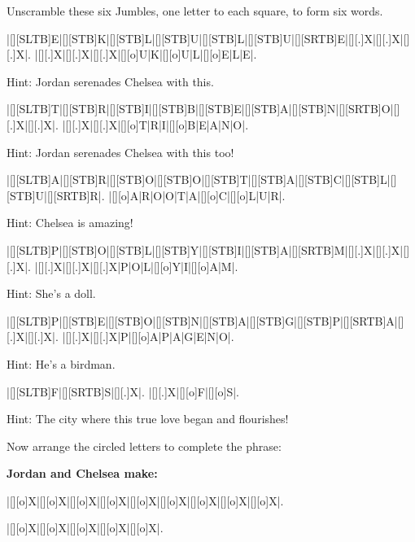 Unscramble these six Jumbles, one letter to each square, to form six words.\\

\begin{Puzzle}{10}{2}
|[][SLTB]E|[][STB]K|[][STB]L|[][STB]U|[][STB]L|[][STB]U|[][SRTB]E|[][.]X|[][.]X|[][.]X|.
|[][.]X|[][.]X|[][.]X|[][o]U|K|[][o]U|L|[][o]E|L|E|.
\end{Puzzle}
Hint: Jordan serenades Chelsea with this.\bigskip

\begin{Puzzle}{10}{2}
|[][SLTB]T|[][STB]R|[][STB]I|[][STB]B|[][STB]E|[][STB]A|[][STB]N|[][SRTB]O|[][.]X|[][.]X|.
|[][.]X|[][.]X|[][o]T|R|I|[][o]B|E|A|N|O|.
\end{Puzzle}
Hint: Jordan serenades Chelsea with this too!\bigskip

\begin{Puzzle}{10}{2}
|[][SLTB]A|[][STB]R|[][STB]O|[][STB]O|[][STB]T|[][STB]A|[][STB]C|[][STB]L|[][STB]U|[][SRTB]R|.
|[][o]A|R|O|O|T|A|[][o]C|[][o]L|U|R|.
\end{Puzzle}
Hint: Chelsea is amazing!\bigskip

\begin{Puzzle}{10}{2}
|[][SLTB]P|[][STB]O|[][STB]L|[][STB]Y|[][STB]I|[][STB]A|[][SRTB]M|[][.]X|[][.]X|[][.]X|.
|[][.]X|[][.]X|[][.]X|P|O|L|[][o]Y|I|[][o]A|M|.
\end{Puzzle}
Hint: She's a doll.\bigskip

\begin{Puzzle}{10}{2}
|[][SLTB]P|[][STB]E|[][STB]O|[][STB]N|[][STB]A|[][STB]G|[][STB]P|[][SRTB]A|[][.]X|[][.]X|.
|[][.]X|[][.]X|P|[][o]A|P|A|G|E|N|O|.
\end{Puzzle}
Hint: He's a birdman.\bigskip

\begin{Puzzle}{10}{2}
|[][SLTB]F|[][SRTB]S|[][.]X|.
|[][.]X|[][o]F|[][o]S|.
\end{Puzzle}
\noindent
Hint: The city where this true love began and flourishes!\bigskip

\noindent
Now arrange the circled letters to complete the phrase:\bigskip

{\bf Jordan and Chelsea make:}\bigskip

\begin{Puzzle}{10}{1}
|[][o]X|[][o]X|[][o]X|[][o]X|[][o]X|[][o]X|[][o]X|[][o]X|[][o]X|.
\end{Puzzle}

\begin{Puzzle}{10}{1}
|[][o]X|[][o]X|[][o]X|[][o]X|[][o]X|.
\end{Puzzle}

